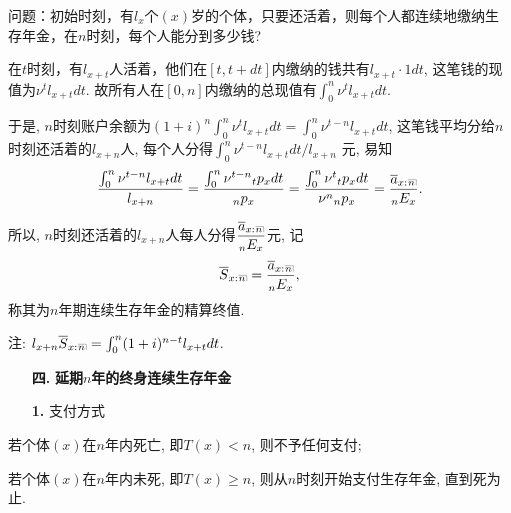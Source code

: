 \documentclass[a4paper,openany, 10pt]{ctexbook}
\makeatletter
\newcommand{\hei}{\CJKfamily{hei}}      %
\DeclareRobustCommand{\annu}[1]{_{%
    \def\arraystretch{0}%
    \setlength\arraycolsep{1pt}%
    \setlength\arrayrulewidth{.2pt}%
    \begin{array}[b]{@{}c|}\hline
        \\[\arraycolsep]%
        \scriptstyle #1%
    \end{array}%
}}
\makeatother
\begin{document}
问题：初始时刻，有$l_x$个$(x)$岁的个体，只要还活着，则每个人都连续地缴纳生存年金，在$n$时刻，每个人能分到多少钱?

在$t$时刻，有$l_{x+t}$人活着，他们在$[t, t+dt]$内缴纳的钱共有$l_{x+t}\cdot 1dt$, 这笔钱的现值为$\nu^tl_{x+t}dt$. 故所有人在$[0, n]$内缴纳的总现值有$ \int_0^{n} \nu^tl_{x+t}dt$.

于是, $n$时刻账户余额为$(1+i)^n\int_0^{n} \nu^tl_{x+t}dt=\int_0^{n} \nu^{t-n}l_{x+t}dt$, 这笔钱平均分给$n$时刻还活着的$l_{x+n}$人, 每个人分得$\int_0^{n} \nu^{t-n}l_{x+t}dt/{l_{x+n}}$ 元, 易知$$\dfrac{\int_0^{n} \nu^{t-n}l_{x+t}dt}{l_{x+n}}=\dfrac{\int_0^{n} \nu^{t-n}{}_tp_xdt}{{}_np_x}=\dfrac{\int_0^{n} \nu^{t}{}_tp_xdt}{\nu^n{}_np_x}=\dfrac{ \overline{a}_{x:}{}\annu{n}}{{}_nE_x}.$$

所以, $n$时刻还活着的$l_{x+n}$人每人分得$\dfrac{ \overline{a}_{x:}{}\annu{n}}{{}_nE_x}$元, 记$$\overline{S}_{x:}{}\annu{n}=\dfrac{ \overline{a}_{x:}{}\annu{n}}{{}_nE_x},$$ 称其为$n$年期连续生存年金的精算终值.

注: $l_{x+n}\overline{S}_{x:}{}\annu{n}=\int_0^{n} (1+i)^{n-t}l_{x+t}dt$.


\begin{itemize}
    \item[{\bf\hei 四.}]{\bf\hei 延期$n$年的终身连续生存年金}
\end{itemize}

\begin{itemize}
    \item[{\bf\hei1.}] 支付方式
\end{itemize}

若个体$(x)$在$n$年内死亡, 即$T(x)<n$, 则不予任何支付;

若个体$(x)$在$n$年内未死, 即$T(x)\ge n$, 则从$n$时刻开始支付生存年金, 直到死为止.
\end{document}
